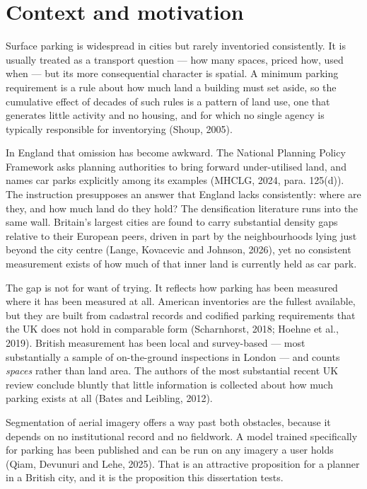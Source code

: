 \hypertarget{context-and-motivation}{%
\section{Context and motivation}\label{context-and-motivation}}

Surface parking is widespread in cities but rarely inventoried consistently. It is usually treated as a transport question --- how many spaces, priced how, used when --- but its more consequential character is spatial. A minimum parking requirement is a rule about how much land a building must set aside, so the cumulative effect of decades of such rules is a pattern of land use, one that generates little activity and no housing, and for which no single agency is typically responsible for inventorying (Shoup, 2005).

In England that omission has become awkward. The National Planning Policy Framework asks planning authorities to bring forward under-utilised land, and names car parks explicitly among its examples (MHCLG, 2024, para. 125(d)). The instruction presupposes an answer that England lacks consistently: where are they, and how much land do they hold? The densification literature runs into the same wall. Britain's largest cities are found to carry substantial density gaps relative to their European peers, driven in part by the neighbourhoods lying just beyond the city centre (Lange, Kovacevic and Johnson, 2026), yet no consistent measurement exists of how much of that inner land is currently held as car park.

The gap is not for want of trying. It reflects how parking has been measured where it has been measured at all. American inventories are the fullest available, but they are built from cadastral records and codified parking requirements that the UK does not hold in comparable form (Scharnhorst, 2018; Hoehne et al., 2019). British measurement has been local and survey-based --- most substantially a sample of on-the-ground inspections in London --- and counts \emph{spaces} rather than land area. The authors of the most substantial recent UK review conclude bluntly that little information is collected about how much parking exists at all (Bates and Leibling, 2012).

Segmentation of aerial imagery offers a way past both obstacles, because it depends on no institutional record and no fieldwork. A model trained specifically for parking has been published and can be run on any imagery a user holds (Qiam, Devunuri and Lehe, 2025). That is an attractive proposition for a planner in a British city, and it is the proposition this dissertation tests.

